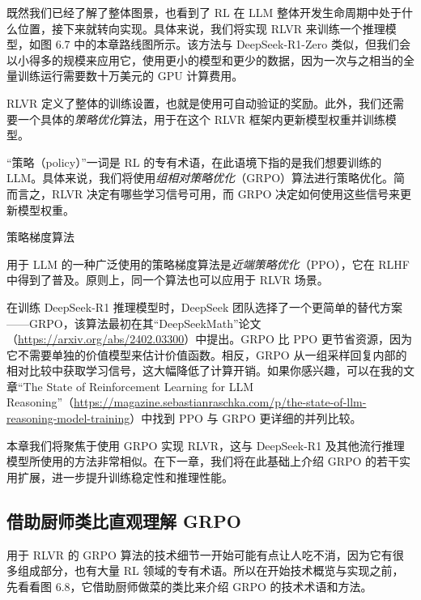 既然我们已经了解了整体图景，也看到了 RL 在 LLM 整体开发生命周期中处于什么位置，接下来就转向实现。具体来说，我们将实现 RLVR 来训练一个推理模型，如图 6.7 中的本章路线图所示。该方法与 DeepSeek-R1-Zero 类似，但我们会以小得多的规模来应用它，使用更小的模型和更少的数据，因为一次与之相当的全量训练运行需要数十万美元的 GPU 计算费用。


RLVR 定义了整体的训练设置，也就是使用可自动验证的奖励。此外，我们还需要一个具体的\emph{策略优化}算法，用于在这个 RLVR 框架内更新模型权重并训练模型。

“策略（policy）”一词是 RL 的专有术语，在此语境下指的是我们想要训练的 LLM。具体来说，我们将使用\emph{组相对策略优化}（GRPO）算法进行策略优化。简而言之，RLVR 决定有哪些学习信号可用，而 GRPO 决定如何使用这些信号来更新模型权重。

\begin{mySidebar}{策略梯度算法}

用于 LLM 的一种广泛使用的策略梯度算法是\emph{近端策略优化}（PPO），它在 RLHF 中得到了普及。原则上，同一个算法也可以应用于 RLVR 场景。

在训练 DeepSeek-R1 推理模型时，DeepSeek 团队选择了一个更简单的替代方案——GRPO，该算法最初在其“DeepSeekMath”论文（\href{https://arxiv.org/abs/2402.03300}{https://arxiv.org/abs/2402.03300}）中提出。GRPO 比 PPO 更节省资源，因为它不需要单独的价值模型来估计价值函数。相反，GRPO 从一组采样回复内部的相对比较中获取学习信号，这大幅降低了计算开销。如果你感兴趣，可以在我的文章“The State of Reinforcement Learning for LLM Reasoning”（\href{https://magazine.sebastianraschka.com/p/the-state-of-llm-reasoning-model-training}{https://magazine.sebastianraschka.com/p/the-state-of-llm-reasoning-model-training}）中找到 PPO 与 GRPO 更详细的并列比较。

本章我们将聚焦于使用 GRPO 实现 RLVR，这与 DeepSeek-R1 及其他流行推理模型所使用的方法非常相似。在下一章，我们将在此基础上介绍 GRPO 的若干实用扩展，进一步提升训练稳定性和推理性能。

\end{mySidebar}

\subsection{借助厨师类比直观理解 GRPO}

用于 RLVR 的 GRPO 算法的技术细节一开始可能有点让人吃不消，因为它有很多组成部分，也有大量 RL 领域的专有术语。所以在开始技术概览与实现之前，先看看图 6.8，它借助厨师做菜的类比来介绍 GRPO 的技术术语和方法。

